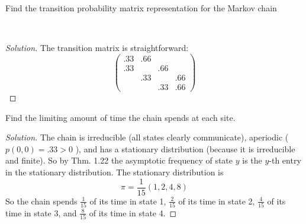 \documentclass[12pt]{article}
\newenvironment{problem}[2][Problem]{\begin{trivlist}
\item[\hskip \labelsep {\bfseries #1}\hskip \labelsep {\bfseries #2.}]}{\end{trivlist}}
\newenvironment{solution}
  {\begin{proof}[Solution]\renewcommand{\qedsymbol}{}}
  {\end{proof}}
\begin{document}
 
\begin{problem}{3a} %
Find the transition probability matrix representation for the Markov chain

\begin{center}

\end{center}
\end{problem}
\ \\
\begin{solution}
The transition matrix is straightforward:
$$
\begin{pmatrix}
.33 & .66 & & \\
.33&  &.66 & \\
&.33 & &.66 \\
& & .33 & .66 
\end{pmatrix}
$$
\end{solution}
\begin{problem}{3b}
Find the limiting amount of time the chain spends at each site.
\end{problem}
\begin{solution}
The chain is irreducible (all states clearly communicate), aperiodic ( $p(0,0)=.33 >0$ ), and has a stationary distribution (because it is irreducible and finite). So by Thm. 1.22 the asymptotic frequency of state $y$ is the $y$-th entry in the stationary distribution. The stationary distribution is
$$ \pi = \frac{1}{15}(1,2,4,8) $$ 
So the chain spends $\frac{1}{15}$ of its time in state 1, $\frac{2}{15}$ of its time in state 2, $\frac{4}{15}$ of its time in state 3, and $\frac{8}{15}$ of its time in state 4.
\end{solution}
\end{document}
